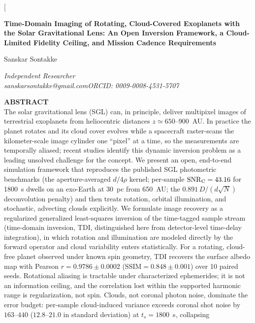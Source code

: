 \documentclass[twocolumn,10pt]{article}
\begin{document}
\twocolumn[{%
\begin{center}
{\Large\bfseries Time-Domain Imaging of Rotating, Cloud-Covered Exoplanets
with the Solar Gravitational Lens: An Open Inversion Framework, a Cloud-Limited
Fidelity Ceiling, and Mission Cadence Requirements\par}
\vspace{2.5mm}
{\large Sanskar Sontakke\par}
\vspace{1mm}
{\small\itshape Independent Researcher\\
sanskarsontakke@gmail.com\quad ORCID: 0009-0008-4531-5707\par}
\vspace{2mm}
\begin{minipage}{0.86\textwidth}
\small
\textbf{ABSTRACT}\\[1mm]
The solar gravitational lens (SGL) can, in principle, deliver multipixel
images of terrestrial exoplanets from heliocentric distances
$z\simeq650$--900~AU. In practice the planet rotates and its cloud cover
evolves while a spacecraft raster-scans the kilometer-scale image cylinder
one ``pixel'' at a time, so the measurements are temporally aliased; recent
studies identify this dynamic inversion problem as a leading unsolved
challenge for the concept. We present an open, end-to-end simulation
framework that reproduces the published SGL photometric benchmarks (the
aperture-averaged $d/4\rho$ kernel; per-sample $\mathrm{SNR}_{\rm C}=43.16$
for 1800~s dwells on an exo-Earth at 30~pc from 650~AU; the
$0.891\,D/(d\sqrt{N})$ deconvolution penalty) and then treats rotation,
orbital illumination, and stochastic, advecting clouds explicitly. We
formulate image recovery as a regularized generalized least-squares
inversion of the time-tagged sample stream (time-domain inversion, TDI,
distinguished here from detector-level time-delay integration), in which
rotation and illumination are modeled directly by the forward operator and
cloud variability enters statistically. For a rotating, cloud-free planet observed under known spin geometry, TDI
recovers the surface albedo map with Pearson $r=0.9786\pm0.0002$
($\mathrm{SSIM}=0.848\pm0.001$) over 10 paired seeds. Rotational aliasing is
tractable under characterized ephemerides; it is not an information ceiling, and
the correlation lost within the supported harmonic range is regularization, not
spin. Clouds, not coronal photon noise, dominate the error budget:
per-sample cloud-induced variance exceeds coronal shot noise by
$163$--$440$ ($12.8$--$21.0$ in standard deviation) at $t_s=1800$~s, collapsing

\end{minipage}
\end{center}}
\end{document}
